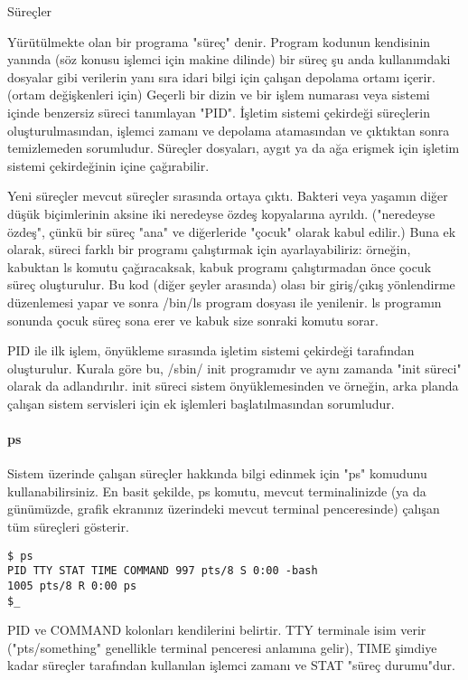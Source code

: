 \begin{section}{Süreçler}

Yürütülmekte olan bir programa "süreç" denir. Program kodunun kendisinin yanında (söz konusu işlemci için makine dilinde) bir süreç şu anda kullanımdaki dosyalar gibi verilerin yanı sıra idari bilgi için çalışan depolama ortamı içerir. (ortam değişkenleri için) Geçerli bir dizin ve bir işlem numarası veya sistemi içinde benzersiz süreci tanımlayan "PID". İşletim sistemi çekirdeği süreçlerin oluşturulmasından, işlemci zamanı ve  depolama atamasından ve çıktıktan sonra temizlemeden sorumludur. Süreçler dosyaları, aygıt ya da ağa erişmek için işletim sistemi çekirdeğinin içine çağırabilir.

Yeni süreçler mevcut süreçler sırasında ortaya çıktı. Bakteri veya yaşamın diğer düşük biçimlerinin aksine iki neredeyse özdeş kopyalarına ayrıldı. ("neredeyse özdeş", çünkü bir süreç "ana" ve diğerleride "çocuk" olarak kabul edilir.) Buna ek olarak, süreci farklı bir programı çalıştırmak için ayarlayabiliriz: örneğin, kabuktan ls komutu çağıracaksak, kabuk programı çalıştırmadan önce çocuk süreç oluşturulur. Bu kod (diğer şeyler arasında) olası bir giriş/çıkış yönlendirme düzenlemesi yapar ve sonra /bin/ls program dosyası ile yenilenir. ls programın sonunda çocuk süreç sona erer ve kabuk size sonraki komutu sorar.

PID ile ilk işlem, önyükleme sırasında işletim sistemi çekirdeği tarafından oluşturulur. Kurala göre bu, /sbin/ init  programıdır ve aynı zamanda "init süreci" olarak da adlandırılır. init süreci sistem önyüklemesinden ve örneğin, arka planda çalışan sistem servisleri için ek işlemleri başlatılmasından sorumludur.

\paragraph{ps}{Sistem üzerinde çalışan süreçler hakkında bilgi edinmek için "ps" komudunu kullanabilirsiniz. En basit şekilde, ps komutu, mevcut terminalinizde (ya da günümüzde, grafik ekranınız üzerindeki mevcut terminal penceresinde) çalışan tüm süreçleri gösterir.}

\begin{verbatim}
$ ps
PID TTY STAT TIME COMMAND 997 pts/8 S 0:00 -bash
1005 pts/8 R 0:00 ps 
$_
\end{verbatim}

PID ve COMMAND kolonları kendilerini belirtir. TTY terminale isim verir ("pts/something" genellikle terminal penceresi anlamına gelir), TIME şimdiye kadar süreçler tarafından kullanılan işlemci zamanı  ve STAT "süreç durumu"dur. 


\end{section}
